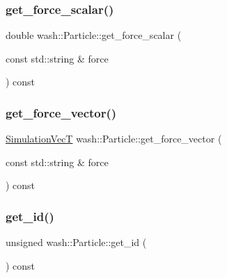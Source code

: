 \mbox{\label{classwash_1_1Particle_ab42a162b41a4e8cf6212bd9c43f3a0cf}} 
\subsubsection{\texorpdfstring{get\+\_\+force\+\_\+scalar()}{get\_force\_scalar()}}
{\footnotesize\ttfamily double wash\+::\+Particle\+::get\+\_\+force\+\_\+scalar (\begin{DoxyParamCaption}\item[{const std\+::string \&}]{force }\end{DoxyParamCaption}) const}

\mbox{\label{classwash_1_1Particle_a9c6ec5d5a7407897ecca00549bd05c01}} 
\subsubsection{\texorpdfstring{get\+\_\+force\+\_\+vector()}{get\_force\_vector()}}
{\footnotesize\ttfamily \mbox{\hyperlink{namespacewash_ab2cbbc37941b733095c9225b49b4cad9}{Simulation\+VecT}} wash\+::\+Particle\+::get\+\_\+force\+\_\+vector (\begin{DoxyParamCaption}\item[{const std\+::string \&}]{force }\end{DoxyParamCaption}) const}

\mbox{\label{classwash_1_1Particle_aef9f2814cc392598de7756e1046fea67}} 
\subsubsection{\texorpdfstring{get\+\_\+id()}{get\_id()}}
{\footnotesize\ttfamily unsigned wash\+::\+Particle\+::get\+\_\+id (\begin{DoxyParamCaption}{ }\end{DoxyParamCaption}) const}



